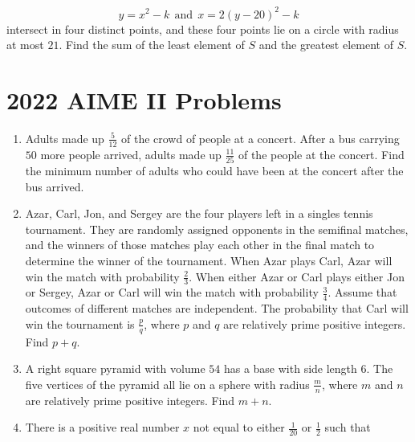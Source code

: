 \documentclass{article}
\begin{document}
\begin{enumerate}[label=\arabic*., itemsep=0.5em]
\begin{equation*}
y=x^2-k~~\text{and}~~x=2(y-20)^2-k
\end{equation*}
intersect in four distinct points, and these four points lie on a circle with radius at most \(21\). Find the sum of the least element of \(S\) and the greatest element of \(S\).\par \vspace{0.5em}\end{enumerate}\newpage\section*{2022 AIME II Problems}
\begin{enumerate}[label=\arabic*., itemsep=0.5em]\item Adults made up \(\frac5{12}\) of the crowd of people at a concert. After a bus carrying \(50\) more people arrived, adults made up \(\frac{11}{25}\) of the people at the concert. Find the minimum number of adults who could have been at the concert after the bus arrived.\par \vspace{0.5em}\item Azar, Carl, Jon, and Sergey are the four players left in a singles tennis tournament. They are randomly assigned opponents in the semifinal matches, and the winners of those matches play each other in the final match to determine the winner of the tournament. When Azar plays Carl, Azar will win the match with probability \(\frac23\). When either Azar or Carl plays either Jon or Sergey, Azar or Carl will win the match with probability \(\frac34\). Assume that outcomes of different matches are independent. The probability that Carl will win the tournament is \(\frac{p}{q}\), where \(p\) and \(q\) are relatively prime positive integers. Find \(p+q\).\par \vspace{0.5em}\item A right square pyramid with volume \(54\) has a base with side length \(6.\) The five vertices of the pyramid all lie on a sphere with radius \(\frac mn\), where \(m\) and \(n\) are relatively prime positive integers. Find \(m+n\).\par \vspace{0.5em}\item There is a positive real number \(x\) not equal to either \(\tfrac{1}{20}\) or \(\tfrac{1}{2}\) such that
\begin{equation*}

\end{equation*}
\end{enumerate}
\end{document}
